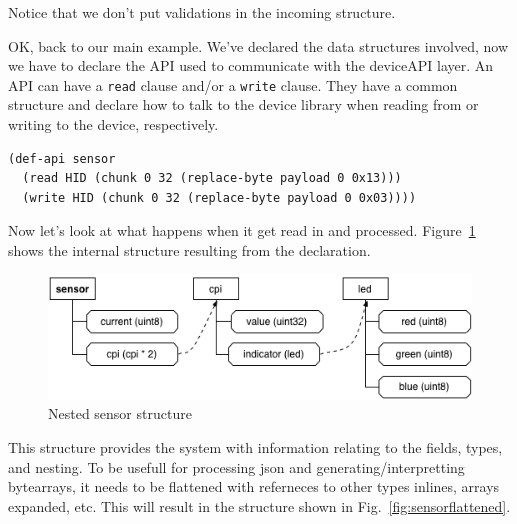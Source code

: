 \documentclass[12pt]{article}
\begin{document}
Notice that we don't put validations in the incoming structure.

OK, back to our main example.  We've declared the data structures
involved, now we have to declare the API used to communicate with the
deviceAPI layer. An API can have a \verb|read| clause and/or a
\verb|write| clause. They have a common structure and declare how to
talk to the device library when reading from or writing to the device,
respectively.

\begin{verbatim}
(def-api sensor
  (read HID (chunk 0 32 (replace-byte payload 0 0x13)))
  (write HID (chunk 0 32 (replace-byte payload 0 0x03))))
\end{verbatim}



Now let's look at what happens when it get
read in and processed. Figure~\ref{fig:sensornested} shows the
internal structure resulting from the declaration.

\begin{figure}[htbp] %
   \centering
   \includegraphics[width=6in]{sensor_nested.png} 
\caption{Nested sensor structure}
\label{fig:sensornested}
\end{figure}

This structure provides the system with information relating to the
fields, types, and nesting. To be usefull for processing json and
generating/interpretting bytearrays, it needs to be flattened with
referneces to other types inlines, arrays expanded, etc. This will
result in the structure shown in Fig.~\ref{fig:sensorflattened}.
\end{document}
